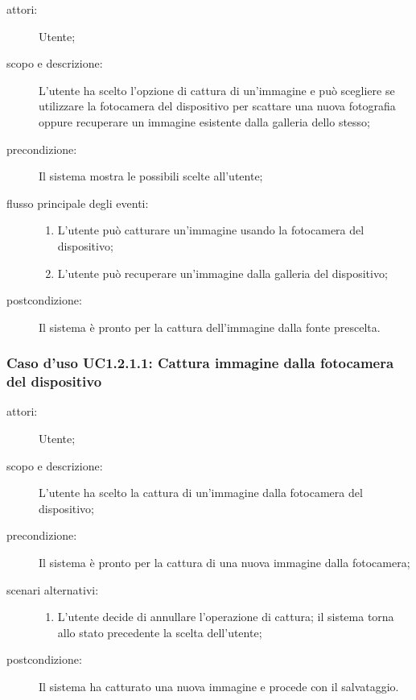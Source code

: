 \begin{description}
\item[attori:] Utente;
\item[scopo e descrizione:] L'utente ha scelto l'opzione di cattura di un'immagine e può scegliere se utilizzare la fotocamera del dispositivo per scattare una nuova fotografia oppure recuperare un immagine esistente dalla galleria dello stesso;
\item[precondizione:] Il sistema mostra le possibili scelte all'utente;
\item[flusso principale degli eventi:] \hfill 
	\begin{enumerate}
	\item L'utente può catturare un'immagine usando la fotocamera del dispositivo;
	\item L'utente può recuperare un'immagine dalla galleria del dispositivo;
	\end{enumerate}
\item[postcondizione:] Il sistema è pronto per la cattura dell'immagine dalla fonte prescelta.
\end{description}

\subsubsection{Caso d'uso UC1.2.1.1: Cattura immagine dalla fotocamera del dispositivo}
\begin{description}
\item[attori:] Utente;
\item[scopo e descrizione:] L'utente ha scelto la cattura di un'immagine dalla fotocamera del dispositivo;
\item[precondizione:] Il sistema è pronto per la cattura di una nuova immagine dalla fotocamera;
\item[scenari alternativi:] \hfill 
	\begin{enumerate}
	\item L'utente decide di annullare l'operazione di cattura; il sistema torna allo stato precedente la scelta dell'utente;
	\end{enumerate}
\item[postcondizione:] Il sistema ha catturato una nuova immagine e procede con il salvataggio.
\end{description}

